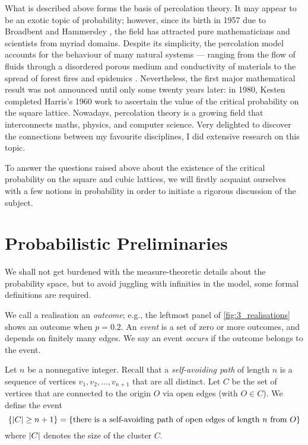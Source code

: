 \documentclass[a4paper, 12pt]{article}
\begin{document}
What is described above forms the basis of percolation theory. It may appear to be an exotic topic of probability; however, since its birth in 1957 due to Broadbent and Hammersley \autocite*[693]{broadbent_hammersley_1957}, the field has attracted pure mathematicians and scientists from myriad domains. Despite its simplicity, the percolation model accounts for the behaviour of many natural systems --- ranging from the flow of fluids through a disordered porous medium and conductivity of materials to the spread of forest fires and epidemics \autocite[60]{gennes_2000}. Nevertheless, the first major mathematical result was not announced until only some twenty years later: in 1980, Kesten \autocite*[41]{kesten_1980} completed Harris's 1960 work \autocite*[13]{harris_1960} to ascertain the value of the critical probability on the square lattice. Nowadays, percolation theory is a growing field that interconnects maths, physics, and computer science. Very delighted to discover the connections between my favourite disciplines, I did extensive research on this topic.

To answer the questions raised above about the existence of the critical probability on the square and cubic lattices, we will firstly acquaint ourselves with a few notions in probability in order to initiate a rigorous discussion of the subject.

\section{Probabilistic Preliminaries}\label{ch:prelims}
We shall not get burdened with the measure-theoretic details about the probability space, but to avoid juggling with infinities in the model, some formal definitions are required.

\begin{defn}\label{defn:outcome_and_event}
We call a realisation an \textit{outcome}; e.g., the leftmost panel of \cref{fig:3_realisations} shows an outcome when $p = 0.2$. An \textit{event} is a set of zero or more outcomes, and depends on finitely many edges. We say an event \textit{occurs} if the outcome belongs to the event.
\end{defn}

\begin{ex}\label{ex:cluster_of_size_n}
Let $n$ be a nonnegative integer. Recall that a \textit{self-avoiding path} of length $n$ is a sequence of vertices $v_1, v_2, \dots, v_{n + 1}$ that are all distinct.
Let $C$ be the set of vertices that are connected to the origin $O$ via open edges (with $O \in C$). We define the event
\[
\{\lvert C \rvert \geq n + 1\}
= \{\text{there is a self-avoiding path of open edges of length } n \text{ from } O\}
\]
where $\lvert C \rvert$ denotes the size of the cluster $C$.

\end{ex}
\end{document}
